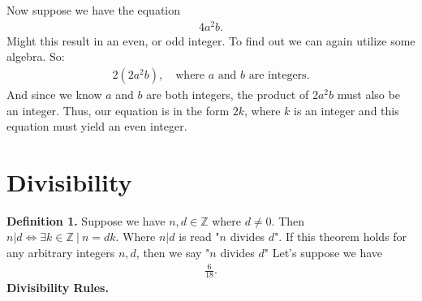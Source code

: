 \documentclass{report}
\begin{document}
    \bigbreak \noindent 
    Now suppose we have the equation
    \begin{align*}
        4a^{2}b
    .\end{align*}
    \bigbreak \noindent 
    Might this result in an even, or odd integer. To find out we can again utilize some algebra. So:
    \begin{align*}
        2(2a^{2}b), \quad \text{where $a$ and $b$ are integers}
    .\end{align*}
    \bigbreak \noindent 
    And since we know $a$ and $b $ are both integers, the product of $2a^{2}b$ must also be an integer. Thus, our equation is in the form $2k$, where $k $ is an integer and this equation must yield an even integer.


    \bigbreak \noindent \bigbreak \noindent 
    \section{\LARGE Divisibility}
    \bigbreak \noindent 
    \textbf{Definition 1.} Suppose we have $n,d \in \mathbb{Z}$ where $d\ne 0$. Then $n|d \iff \exists k \in \mathbb{Z}\ |\ n = dk$. Where $n|d$ is read "$n$ divides $d$". If this theorem holds for any arbitrary integers $n,d$, then we say "$n$ divides $d$"
    \bigbreak \noindent 
    Let's suppose we have
    \begin{align*}
        \frac{6}{18}
    .\end{align*}
    \bigbreak \noindent 
    \textbf{Divisibility Rules.}
\end{document}
